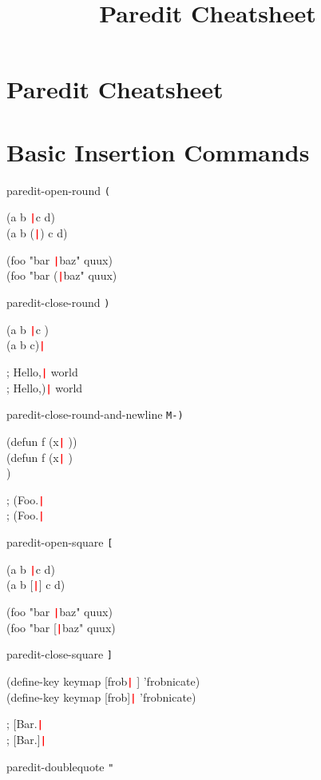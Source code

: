 \documentclass[landscape,a4paper]{article}
\title{Paredit Cheatsheet}
\begin{document}
  \newcommand{\cursor}{\texttt{\textcolor{red}{\textbf{|}}}}

  \begin{multicols}{4}

    \section*{\LARGE{Paredit Cheatsheet}}

    \section*{Basic Insertion Commands}

paredit-open-round \texttt{(}

\ttfamily
(a b \cursor c d)\\
(a b (\cursor) c d)

(foo "bar \cursor baz" quux)\\
(foo "bar (\cursor baz" quux)
\rmfamily

paredit-close-round \texttt{)}

\ttfamily
(a b \cursor c \space\space)\\
(a b c)\cursor

; Hello,\cursor{} world\\
; Hello,)\cursor{} world
\rmfamily

paredit-close-round-and-newline \texttt{M-)}

\ttfamily
(defun f (x\cursor{} \space))\\
(defun f (x\cursor{} \space)\\
)

; (Foo.\cursor\\
; (Foo.\cursor
\rmfamily

paredit-open-square \texttt{[}

\ttfamily
(a b \cursor c d)\\
(a b [\cursor] c d)

(foo "bar \cursor baz" quux)\\
(foo "bar [\cursor baz" quux)
\rmfamily

paredit-close-square \texttt{]}

\ttfamily
(define-key keymap [frob\cursor{} \space] 'frobnicate)\\
(define-key keymap [frob]\cursor{} 'frobnicate)

; [Bar.\cursor\\
; [Bar.]\cursor
\rmfamily

paredit-doublequote \texttt{"}


\end{multicols}
\end{document}
